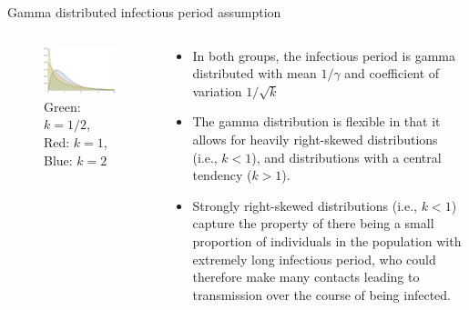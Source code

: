 \documentclass[
  ignorenonframetext,
]{beamer}
\providecommand{\tightlist}{%
  \setlength{\itemsep}{0pt}\setlength{\parskip}{0pt}}
\begin{document}
\begin{frame}{Gamma distributed infectious period assumption}
\protect\hypertarget{gamma-distributed-infectious-period-assumption}{}
\begin{columns}[T]
\begin{column}{0.4\textwidth}
\begin{figure}
\centering
\includegraphics{gammadistrib.pdf}
\caption{Green: \(k=1/2\), Red: \(k=1\), Blue: \(k=2\)}
\end{figure}
\end{column}

\begin{column}{0.6\textwidth}
\begin{itemize}
\tightlist
\item
  In both groups, the infectious period is gamma distributed with mean
  \(1/\gamma\) and coefficient of variation \(1/\sqrt{k}\)
\item
  The gamma distribution is flexible in that it allows for heavily
  right-skewed distributions (i.e., \(k<1\)), and distributions with a
  central tendency (\(k>1\)).
\item
  Strongly right-skewed distributions (i.e., \(k<1\)) capture the
  property of there being a small proportion of individuals in the
  population with extremely long infectious period, who could therefore
  make many contacts leading to transmission over the course of being
  infected.
\end{itemize}
\end{column}
\end{columns}
\end{frame}
\end{document}
